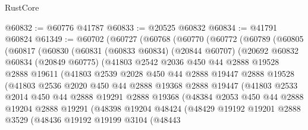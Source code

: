 \begin{lexlean}{RustCore}
\begin{coremodule}
@60832 := @60776 @41787
@60833 := @20525 @60832
@60834 := @41791 @60824
@61349 := @60702
    (@60727
      (@60768
        (@60770
          (@60772
            (@60789
              (@60805
                (@60817
                  (@60830
                    (@60831
                      (@60833 @60834)
                      (@20844 @60707)
                      (@20692
                        @60832
                        @60834
                        (@20849 @60775)
                        (@41803
                          @2542
                          @2036
                          @450
                          @44
                          @2888
                          @19528
                          @2888
                          @19611
                          (@41803
                            @2539
                            @2028
                            @450
                            @44
                            @2888
                            @19447
                            @2888
                            @19528
                            (@41803
                              @2536
                              @2020
                              @450
                              @44
                              @2888
                              @19368
                              @2888
                              @19447
                              (@41803
                                @2533
                                @2014
                                @450
                                @44
                                @2888
                                @19291
                                @2888
                                @19368
                                (@48384
                                  @2053
                                  @450
                                  @44
                                  @2888
                                  @19204
                                  @2888
                                  @19291
                                  (@48398
                                    @19204
                                    @48424
                                    (@48429
                                      @19192
                                      @19201
                                      @2888
                                      @3529
                                      (@48436
                                        @19192
                                        @19199
                                        @3104
                                        (@48443

\end{coremodule}
\end{lexlean}
